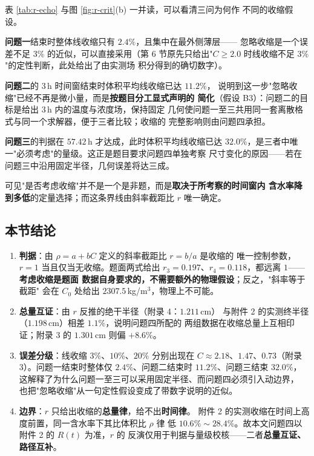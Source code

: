 \documentclass[12pt,a4paper,fontset=none]{ctexart}
\begin{document}
表 \ref{tab:r-echo} 与图 \ref{fig:r-crit}(b) 一并读，可以看清三问为何作
不同的收缩假设。

\textbf{问题一}结束时整体线收缩只有 $2.4\%$，且集中在最外侧薄层——
忽略收缩是一个误差不足 $3\%$ 的近似，可以直接采用（第 6 节原先只给出"$C\ge2.0$ 时线收缩不足 $3\%$"的定性判断，此处给出了由实测场
积分得到的确切数字）。

\textbf{问题二}的 $3$\,h 时间窗结束时体积平均线收缩已达 $11.2\%$，
说明到这一步"忽略收缩"已经不再是微小量，而是\textbf{按题目分工显式声明的
简化}（假设 B3）：问题二的目标是给出 $3$\,h 内的温度与浓度场，保持固定
几何使问题一至三共用同一套离散格式与同一个求解器，便于三者比较；收缩的
完整影响则由问题四承担。

\textbf{问题三}的判据在 $57.42$\,h 才达成，此时体积平均线收缩已达
$32.0\%$，是三者中唯一"必须考虑"的量级。这正是题目要求问题四单独考察
尺寸变化的原因——若在问题三中沿用固定半径，几何误差将达三成。

可见"是否考虑收缩"并不是一个是非题，而是\textbf{取决于所考察的时间窗内
含水率降到多低}的定量选择；而这条界线由斜率截距比 $r$ 唯一确定。

\subsection{本节结论}

\begin{enumerate}
  \item \textbf{判据}：由 $\rho=a+bC$ 定义的斜率截距比 $r=b/a$ 是收缩的
        唯一控制参数，$r=1$ 当且仅当无收缩。题面两式给出
        $r_3=0.197$、$r_4=0.118$，都远离 $1$——\textbf{考虑收缩是题面
        数据自身要求的，不需要额外的物理假设}；反之，"斜率等于截距"
        会在 $C_0$ 处给出 $2307.5$\,kg/m$^3$，物理上不可能。
  \item \textbf{总量互证}：由 $r$ 反推的绝干半径（附录 4：$1.211$\,cm）
        与附件 2 的实测终半径（$1.198$\,cm）相差 $1.1\%$，说明问题四所配的
        两组数据在收缩总量上互相印证；附录 3 的 $1.301$\,cm 则偏 $+8.6\%$。
  \item \textbf{误差分级}：线收缩 $3\%$、$10\%$、$20\%$ 分别出现在
        $C\approx2.18$、$1.47$、$0.73$（附录 3）。问题一结束时整体仅
        $2.4\%$、问题二结束时 $11.2\%$、问题三结束 $32.0\%$，
        这解释了为什么问题一至三可以采用固定半径、而问题四必须引入动边界，
        也把"忽略收缩"从一句定性假设变成了带数字说明的近似。
  \item \textbf{边界}：$r$ 只给出收缩的\textbf{总量律}，给不出\textbf{时间律}。
        附件 2 的实测收缩在时间上高度前置，同一含水率下其比体积比 $\rho$ 律
        低 $10.6\%\sim28.4\%$。故本文问题四以附件 2 的 $R(t)$ 为准，$r$ 的
        反演仅用于判据与量级校核——二者\textbf{总量互证、路径互补}。
\end{enumerate}
\end{document}
